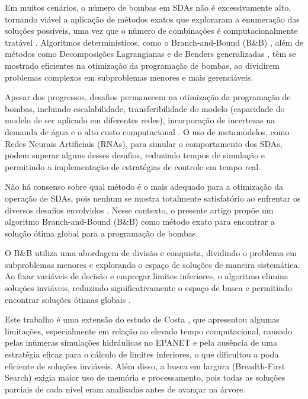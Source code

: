 \documentclass[12pt,a4paper,oneside,linenumbers=off,latinmodern=off,timesnews=off,english,spanish]{rctart-class/rctart}
\begin{document}
Em muitos cenários, o número de bombas em SDAs não é excessivamente alto, tornando viável a aplicação de métodos exatos que exploraram a enumeração das soluções possíveis, uma vez que o número de combinações é computacionalmente tratável \cite{Costa2015}. Algoritmos determinísticos, como o Branch-and-Bound (B\&B) \cite{land2010automatic, costa2001global}, além de métodos como Decomposições Lagrangianas \cite{Ghaddar2015} e de Benders generalizadas \cite{verleye2016generalized}, têm se mostrado eficientes na otimização da programação de bombas, ao dividirem problemas complexos em subproblemas menores e mais gerenciáveis.

Apesar dos progressos, desafios permanecem na otimização da programação de bombas, incluindo escalabilidade, transferibilidade do modelo (capacidade do modelo de ser aplicado em diferentes redes), incorporação de incertezas na demanda de água e o alto custo computacional \cite{Kerimov2023}. O uso de metamodelos, como Redes Neurais Artificiais (RNAs)\cite{behzadian2009stochastic, broad2005water, rao2007use}, para simular o comportamento dos SDAs, podem superar alguns desses desafios, reduzindo tempos de simulação e permitindo a implementação de estratégias de controle em tempo real.

Não há consenso sobre qual método é o mais adequado para a otimização da operação de SDAs, pois nenhum se mostra totalmente satisfatório ao enfrentar os diversos desafios envolvidos \cite{MalaJetmarova2017}. Nesse contexto, o presente artigo propõe um algoritmo Branch-and-Bound (B\&B) como método exato para encontrar a solução ótima global para a programação de bombas. 

O B\&B utiliza uma abordagem de divisão e conquista, dividindo o problema em subproblemas menores e explorando o espaço de soluções de maneira sistemática. Ao fixar variáveis de decisão e empregar limites inferiores, o algoritmo elimina soluções inviáveis, reduzindo significativamente o espaço de busca e permitindo encontrar soluções ótimas globais \cite{Costa2015}.

Este trabalho é uma extensão do estudo de Costa \cite{Costa2015}, que apresentou algumas limitações, especialmente em relação ao elevado tempo computacional, causado pelas inúmeras simulações hidráulicas no EPANET e pela ausência de uma estratégia eficaz para o cálculo de limites inferiores, o que dificultou a poda eficiente de soluções inviáveis. Além disso, a busca em largura (Breadth-First Search) exigia maior uso de memória e processamento, pois todas as soluções parciais de cada nível eram analisadas antes de avançar na árvore.
\end{document}
